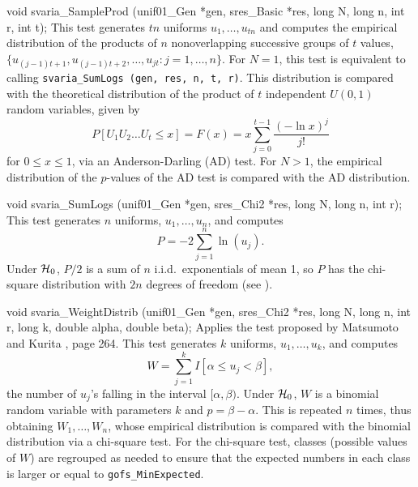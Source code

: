 void svaria_SampleProd (unif01_Gen *gen, sres_Basic *res,
                        long N, long n, int r, int t);
\endcode
 \tab
  This test generates $t n$ uniforms $u_1,\dots,u_{tn}$ and
  computes
  the empirical distribution of the products of $n$ nonoverlapping 
  successive groups of $t$ values, $\{u_{(j-1)t + 1},  u_{(j-1)t + 2},
  \ldots, u_{jt}: j=1,\dots,n\}$.   
  For $N=1$, this test is equivalent to calling
   {\tt svaria\_SumLogs (gen, res, n, t, r)}.
  This distribution is compared with the theoretical distribution of
  the product of $t$  independent $U(0,1)$ random variables, given by
  $$
  P[U_1U_2\ldots U_t \le x] = F(x) = x \sum_{j=0}^{t-1} \frac {(-\ln x)^j} {j!}
  $$
  for $0\le x\le 1$, via an Anderson-Darling (AD) test.
  For $N > 1$, the empirical distribution of the $p$-values of the 
  AD test is compared with the AD distribution.
 \endtab
\code


void svaria_SumLogs (unif01_Gen *gen, sres_Chi2 *res,
                     long N, long n, int r);
\endcode
 \tab
  This test generates $n$ uniforms, $u_1,\dots,u_n$, and computes
   $$
    P = - 2 \sum_{j=1}^n \ln (u_j).
   $$
  Under $\mathcal{H}_0$, $P/2$ is a sum of $n$ i.i.d.\ exponentials of mean 1,
  so $P$ has the chi-square distribution with $2n$ degrees of freedom
  (see \cite{tSTE86a}).
 \endtab
\code


void svaria_WeightDistrib (unif01_Gen *gen, sres_Chi2 *res, long N, long n,
                           int r, long k, double alpha, double beta);
\endcode
 \tab
  Applies the test proposed by Matsumoto and Kurita \cite{rMAT94a}, page 264. 
  This test
  generates $k$ uniforms, $u_1,\dots,u_k$, and computes
    $$ W = \sum_{j=1}^k I[\alpha\le u_j < \beta],$$
   the number of $u_j$'s falling in the interval $[\alpha,\beta)$.
   Under $\mathcal{H}_0$, $W$ is a binomial random variable  with parameters $k$ and
   $p = \beta-\alpha$.
   This is repeated $n$ times, thus obtaining $W_1,\dots,W_n$,
   whose empirical distribution is compared with the binomial
   distribution via a chi-square test.
   For the chi-square test, classes (possible values of $W$) are
   regrouped as needed to ensure that the expected numbers in each 
   class is larger or equal to {\tt gofs\_MinExpected}.
 \endtab
\code


